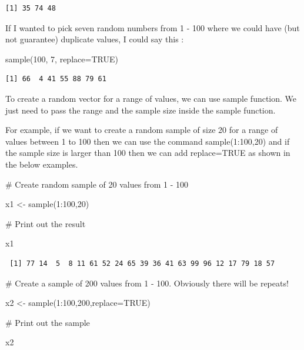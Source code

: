 \documentclass[
  letterpaper,
  DIV=11,
  numbers=noendperiod]{scrreprt}
\newenvironment{Shaded}{\begin{snugshade}}{\end{snugshade}}
\newcommand{\AttributeTok}[1]{\textcolor[rgb]{0.40,0.45,0.13}{#1}}
\newcommand{\CommentTok}[1]{\textcolor[rgb]{0.37,0.37,0.37}{#1}}
\newcommand{\ConstantTok}[1]{\textcolor[rgb]{0.56,0.35,0.01}{#1}}
\newcommand{\DecValTok}[1]{\textcolor[rgb]{0.68,0.00,0.00}{#1}}
\newcommand{\FunctionTok}[1]{\textcolor[rgb]{0.28,0.35,0.67}{#1}}
\newcommand{\NormalTok}[1]{\textcolor[rgb]{0.00,0.23,0.31}{#1}}
\newcommand{\OtherTok}[1]{\textcolor[rgb]{0.00,0.23,0.31}{#1}}
\newcommand{\SpecialCharTok}[1]{\textcolor[rgb]{0.37,0.37,0.37}{#1}}
\begin{document}
\begin{verbatim}
[1] 35 74 48
\end{verbatim}

If I wanted to pick seven random numbers from 1 - 100 where we could
have (but not guarantee) duplicate values, I could say this :

\begin{Shaded}
\begin{Highlighting}[]
\FunctionTok{sample}\NormalTok{(}\DecValTok{100}\NormalTok{, }\DecValTok{7}\NormalTok{, }\AttributeTok{replace=}\ConstantTok{TRUE}\NormalTok{)}
\end{Highlighting}
\end{Shaded}

\begin{verbatim}
[1] 66  4 41 55 88 79 61
\end{verbatim}

To create a random vector for a range of values, we can use sample
function. We just need to pass the range and the sample size inside the
sample function.

For example, if we want to create a random sample of size 20 for a range
of values between 1 to 100 then we can use the command sample(1:100,20)
and if the sample size is larger than 100 then we can add replace=TRUE
as shown in the below examples.

\begin{Shaded}
\begin{Highlighting}[]
\CommentTok{\# Create random sample of 20 values from 1 {-} 100}

\NormalTok{x1 }\OtherTok{\textless{}{-}} \FunctionTok{sample}\NormalTok{(}\DecValTok{1}\SpecialCharTok{:}\DecValTok{100}\NormalTok{,}\DecValTok{20}\NormalTok{)}

\CommentTok{\# Print out the result}

\NormalTok{x1}
\end{Highlighting}
\end{Shaded}

\begin{verbatim}
 [1] 77 14  5  8 11 61 52 24 65 39 36 41 63 99 96 12 17 79 18 57
\end{verbatim}

\begin{Shaded}
\begin{Highlighting}[]
\CommentTok{\# Create a sample of 200 values from 1 {-} 100. Obviously there will be repeats!}

\NormalTok{x2 }\OtherTok{\textless{}{-}} \FunctionTok{sample}\NormalTok{(}\DecValTok{1}\SpecialCharTok{:}\DecValTok{100}\NormalTok{,}\DecValTok{200}\NormalTok{,}\AttributeTok{replace=}\ConstantTok{TRUE}\NormalTok{)}

\CommentTok{\# Print out the sample}

\NormalTok{x2}
\end{Highlighting}
\end{Shaded}
\end{document}
